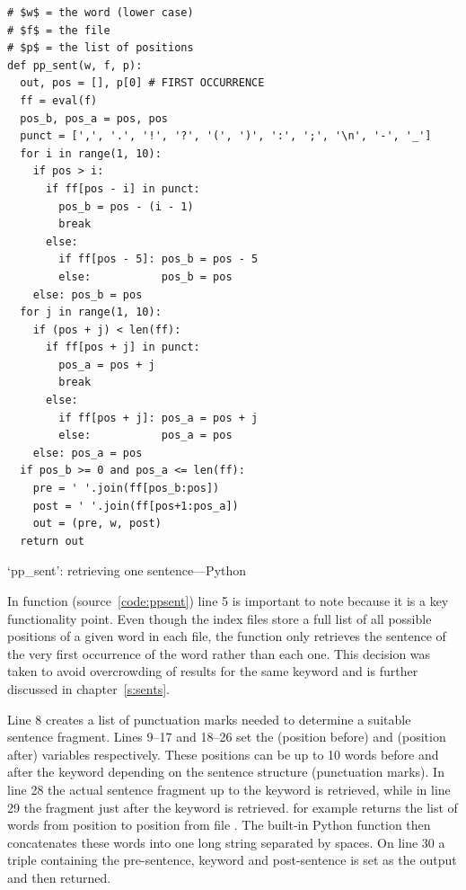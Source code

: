 \begin{listing}[!htbp] %
  \begin{verbatim}
# $w$ = the word (lower case)
# $f$ = the file
# $p$ = the list of positions
def pp_sent(w, f, p):
  out, pos = [], p[0] # FIRST OCCURRENCE
  ff = eval(f)
  pos_b, pos_a = pos, pos
  punct = [',', '.', '!', '?', '(', ')', ':', ';', '\n', '-', '_']
  for i in range(1, 10):
    if pos > i:
      if ff[pos - i] in punct:
        pos_b = pos - (i - 1)
        break
      else:
        if ff[pos - 5]: pos_b = pos - 5
        else:           pos_b = pos
    else: pos_b = pos
  for j in range(1, 10):
    if (pos + j) < len(ff):
      if ff[pos + j] in punct:
        pos_a = pos + j
        break
      else:
        if ff[pos + j]: pos_a = pos + j
        else:           pos_a = pos
    else: pos_a = pos
  if pos_b >= 0 and pos_a <= len(ff):
    pre = ' '.join(ff[pos_b:pos])
    post = ' '.join(ff[pos+1:pos_a])
    out = (pre, w, post)
  return out
  \end{verbatim}
\caption[`pp\_sent' function---Python]{`pp\_sent': retrieving one sentence---Python}
\label{code:ppsent}
\end{listing}

In function  (source~\ref{code:ppsent}) line 5 is important to note because it is a key functionality point. Even though the index files store a full list of all possible positions of a given word in each file, the  function only retrieves the sentence of the very first occurrence of the word rather than each one. This decision was taken to avoid overcrowding of results for the same keyword and is further discussed in chapter~\ref{s:sents}.

Line 8 creates a list of punctuation marks needed to determine a suitable sentence fragment. Lines 9--17 and 18--26 set the  (position before) and  (position after) variables respectively. These positions can be up to 10 words before and after the keyword  depending on the sentence structure (punctuation marks). In line 28 the actual sentence fragment up to the keyword is retrieved, while in line 29 the fragment just after the keyword is retrieved.  for example returns the list of words from position  to position  from file . The built-in Python  function then concatenates these words into one long string separated by spaces. On line 30 a triple containing the pre-sentence, keyword and post-sentence is set as the output and then returned.


